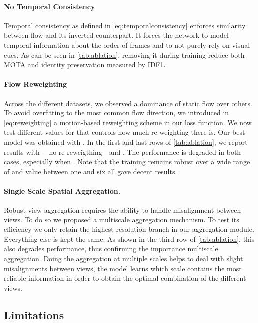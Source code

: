 \documentclass[10pt,twocolumn,letterpaper]{article}
\begin{document}
\paragraph*{No Temporal Consistency}
Temporal consistency as defined in \cref{eq:temporalconsistency} enforces similarity between flow and its inverted counterpart. It forces the network to model temporal information about the order of frames and to not purely rely on visual cues. As can be seen in \cref{tab:ablation}, removing it during training reduce both MOTA and identity preservation measured by IDF1. 

\paragraph*{Flow Reweighting}

Across the different datasets, we observed a dominance of static flow over others. To avoid overfitting to the most common flow direction, we introduced in \cref{eq:reweighting} a motion-based reweighting scheme in our loss function. We now test different values for  that controls how much  re-weighting there is. Our best model was obtained with . In the first and last rows of \cref{tab:ablation}, we report results with  ---no re-reweigthing---and . The performance is degraded in both cases, especially when  . Note that the training remains robust over a wide range of  and value between one and six all gave decent results.

\paragraph*{Single Scale Spatial Aggregation.}

Robust view aggregation requires the ability to handle misalignment between views. To do so we proposed a multiscale aggregation mechanism. To test its efficiency we only retain the highest resolution branch in our aggregation module. Everything else is kept the same. As shown in the third row of \cref{tab:ablation}, this also degrades performance, thus confirming the importance  multiscale aggregation. Doing the aggregation at multiple scales helps to deal with slight misalignments between views, the model learns which scale contains the most reliable information in order to obtain the optimal combination of the different views.


 \subsection{Limitations}
\end{document}

